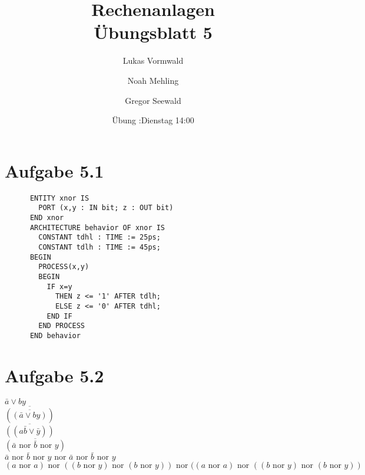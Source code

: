 \documentclass[11pt,a4paper]{article}
\title{Rechenanlagen\\Übungsblatt 5}
\author{Lukas Vormwald \and Noah Mehling \and Gregor Seewald}
\date{Übung :Dienstag 14:00}
\newcommand{\nor}[0]{\ensuremath{\text{ nor }}}
\begin{document}
\maketitle
  \section*{Aufgabe 5.1}
    \begin{verbatim}
      ENTITY xnor IS
        PORT (x,y : IN bit; z : OUT bit)
      END xnor
      ARCHITECTURE behavior OF xnor IS
        CONSTANT tdhl : TIME := 25ps;
        CONSTANT tdlh : TIME := 45ps;
      BEGIN
        PROCESS(x,y)
        BEGIN
          IF x=y
            THEN z <= '1' AFTER tdlh;
            ELSE z <= '0' AFTER tdhl;
          END IF
        END PROCESS
      END behavior
    \end{verbatim}
  \section*{Aufgabe 5.2}
    $\bar a \vee by$\\
    $\overline{(\overline{(\bar a \vee by)})}$\\
    $\overline{((a \bar b \vee \bar y))}$\\
    $\overline{(\bar a \nor \bar b \nor y)}$\\
    $\bar a \nor \bar b \nor y \nor \bar a \nor \bar b \nor y$\\
    $(a \nor a) \nor ((b \nor y) \nor (b \nor y)) \nor ((a \nor a) \nor ((b \nor y) \nor (b \nor y))$
\end{document}
